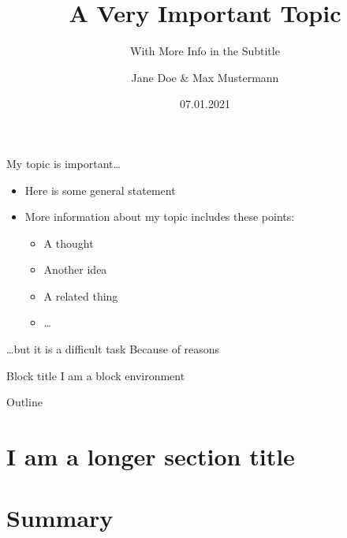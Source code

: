 \documentclass[aspectratio=169]{beamer}
\title{A Very Important Topic}
\subtitle{With More Info in the Subtitle}
\author{Jane Doe \& Max Mustermann}
\institute{Database Group\\University of Leipzig}
\date{07.01.2021}
\begin{document}
  
  
  \begin{frame}[plain]
    \titlepage{}
  \end{frame}
  
  
\begin{frame}{My topic is important\dots }
\begin{itemize}
  \item Here is some general statement 
  \item More information about my topic includes these points: 
    \begin{itemize}
      \item A thought
      \item Another idea
      \item A related thing 
      \item \dots
    \end{itemize}
\end{itemize}
\end{frame}


\begin{frame}{\dots but it is a difficult task}
  Because of reasons
  \begin{block}{Block title}
    I am a block environment 
  \end{block}
\end{frame}
\begin{frame}{Outline}
\tableofcontents[hideallsubsections]
\end{frame}


\section[A short section title]{I am a longer section title}
\section{Summary}

\begin{frame}

\end{frame}

\begin{frame}

\end{frame}

\begin{frame}

\end{frame}

\begin{frame}

\end{frame}

\begin{frame}

\end{frame}

\begin{frame}

\end{frame}
\end{document}
